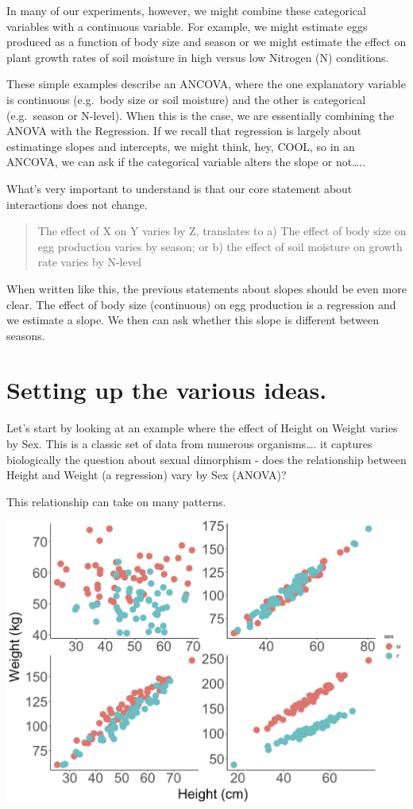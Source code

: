\documentclass[
]{book}
\begin{document}
In many of our experiments, however, we might combine these categorical variables with a continuous variable. For example, we might estimate eggs produced as a function of body size and season or we might estimate the effect on plant growth rates of soil moisture in high versus low Nitrogen (N) conditions.

These simple examples describe an ANCOVA, where the one explanatory variable is continuous (e.g.~body size or soil moisture) and the other is categorical (e.g.~season or N-level). When this is the case, we are essentially combining the ANOVA with the Regression. If we recall that regression is largely about estimatinge slopes and intercepts, we might think, hey, COOL, so in an ANCOVA, we can ask if the categorical variable alters the slope or not\ldots..

What's very important to understand is that our core statement about interactions does not change.

\begin{quote}
The effect of X on Y varies by Z, translates to a) The effect of body size on egg production varies by season; or b) the effect of soil moisture on growth rate varies by N-level
\end{quote}

When written like this, the previous statements about slopes should be even more clear. The effect of body size (continuous) on egg production is a regression and we estimate a slope. We then can ask whether this slope is different between seasons.

\hypertarget{setting-up-the-various-ideas.}{%
\section{Setting up the various ideas.}\label{setting-up-the-various-ideas.}}

Let's start by looking at an example where the effect of Height on Weight varies by Sex. This is a classic set of data from numerous organisms\ldots. it captures biologically the question about sexual dimorphism - does the relationship between Height and Weight (a regression) vary by Sex (ANOVA)?

This relationship can take on many patterns.

\includegraphics[width=17.89in]{images/ANCOVA_1}
\end{document}
